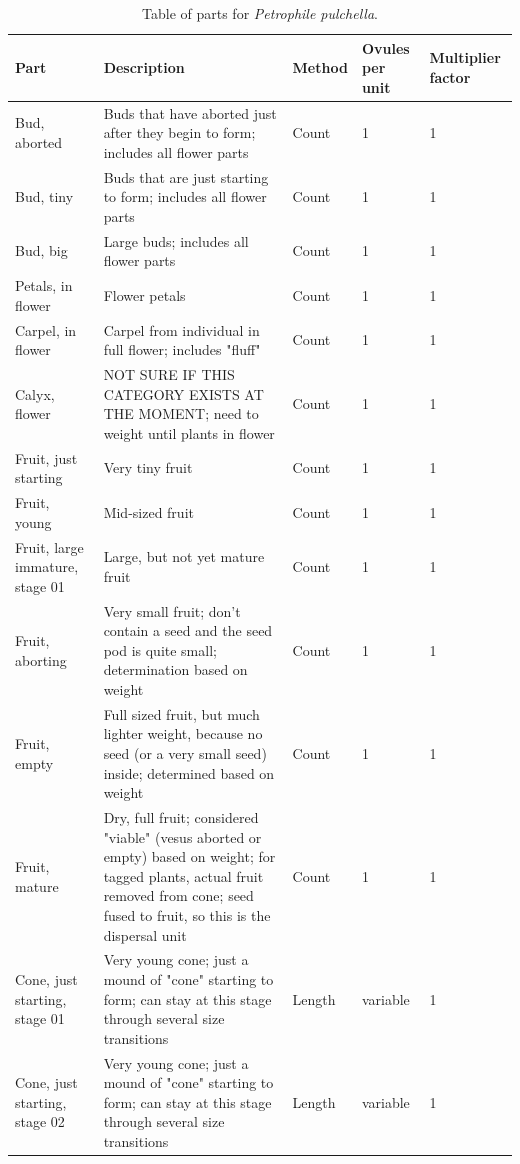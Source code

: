 \documentclass[10pt,twoside]{article}\usepackage[]{graphicx}\usepackage[]{color}
\begin{document}
\begingroup\small
\begin{longtable}{p{4.5cm}p{6cm}p{2cm}p{1cm}p{1cm}}
\caption{Table of parts for \emph{Petrophile pulchella}.} \\ 
  \hline
Part & Description & Method & Ovules per unit & Multiplier factor \\ 
  \hline
Bud, aborted & Buds that have aborted just after they begin to form; includes all flower parts & Count & 1 &   1 \\ 
  Bud, tiny & Buds that are just starting to form; includes all flower parts & Count & 1 &   1 \\ 
  Bud, big & Large buds; includes all flower parts & Count & 1 &   1 \\ 
  Petals, in flower & Flower petals & Count & 1 &   1 \\ 
  Carpel, in flower & Carpel from individual in full flower; includes "fluff" & Count & 1 &   1 \\ 
  Calyx, flower & NOT SURE IF THIS CATEGORY EXISTS AT THE MOMENT; need to weight until plants in flower & Count & 1 &   1 \\ 
  Fruit, just starting & Very tiny fruit & Count & 1 &   1 \\ 
  Fruit, young & Mid-sized fruit & Count & 1 &   1 \\ 
  Fruit, large immature, stage 01 & Large, but not yet mature fruit & Count & 1 &   1 \\ 
  Fruit, aborting & Very small fruit; don't contain a seed and the seed pod is quite small; determination based on weight & Count & 1 &   1 \\ 
  Fruit, empty & Full sized fruit, but much lighter weight, because no seed (or a very small seed) inside; determined based on weight & Count & 1 &   1 \\ 
  Fruit, mature & Dry, full fruit; considered "viable" (vesus aborted or empty) based on weight; for tagged plants, actual fruit removed from cone; seed fused to fruit, so this is the dispersal unit & Count & 1 &   1 \\ 
  Cone, just starting, stage 01 & Very young cone; just a mound of "cone" starting to form; can stay at this stage through several size transitions & Length & variable &   1 \\ 
  Cone, just starting, stage 02 & Very young cone; just a mound of "cone" starting to form; can stay at this stage through several size transitions & Length & variable &   1 \\ 

\end{longtable}
\end{document}
